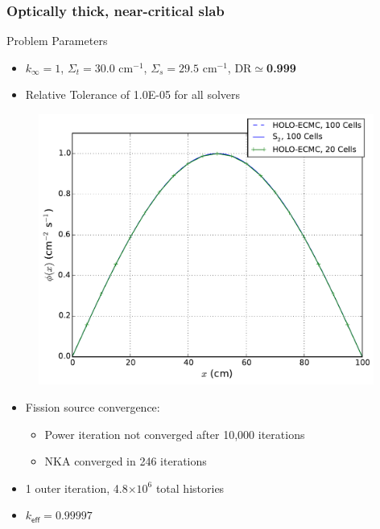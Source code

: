 \documentclass[xcolor=dvipsnames,handout]{beamer}
\newcommand{\keff}[0]{\ensuremath{{k}_{\textsf{eff}}} }
\newcommand{\coly}[1]{{\color{yellow} #1}}
\newlength{\wideitemsep}
\let\olditem\item
\renewcommand{\item}{\setlength{\itemsep}{\wideitemsep}\olditem}
\begin{document}
\begin{frame}
    \frametitle{\coly{Optically thick, near-critical slab}}
    \fontsize{9}{5.0}\selectfont
    \begin{block}{Problem Parameters}
    \begin{itemize}
        \item $k_\infty = 1$, $\Sigma_t = 30.0$ cm$^{-1}$, $\Sigma_s=29.5$ cm$^{-1}$,
            DR$\simeq$\textbf{0.999}
        \item Relative Tolerance of 1.0E-05 for all solvers
    \end{itemize}
    \end{block}
    \begin{minipage}{0.49\textwidth}
    \begin{figure}
    \centering
    \includegraphics[width=0.98\textwidth]{highdr_fiss_src.pdf}
    \end{figure}
    \end{minipage}
    \begin{minipage}{0.49\textwidth}
        \begin{itemize}
            \item Fission source convergence:
            \begin{itemize}
            \item Power iteration not converged after 10,000 iterations
            \item NKA converged in 246 iterations
            \end{itemize}
            \item 1 outer iteration, 4.8$\times 10^6$ total histories
            \item $\keff = 0.99997$ 
        \end{itemize}
    \end{minipage}
\end{frame}
\end{document}
